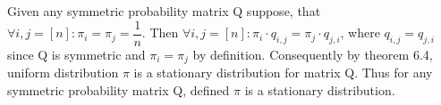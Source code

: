 Given any symmetric probability matrix Q suppose, that $\forall i,j = [n]: \pi_i = \pi_j = \dfrac{1}{n}$. 
Then $\forall i,j = [n]: \pi_i \cdot q_{i,j} = \pi_j \cdot q_{j,i}$,
where $q_{i,j} = q_{j,i}$ since Q is symmetric and $\pi_i = \pi_j$ by definition.
Consequently by theorem 6.4, uniform distribution $\pi$ is a stationary distribution for matrix Q.
Thus for any symmetric probability matrix Q, defined $\pi$ is a stationary distribution. 